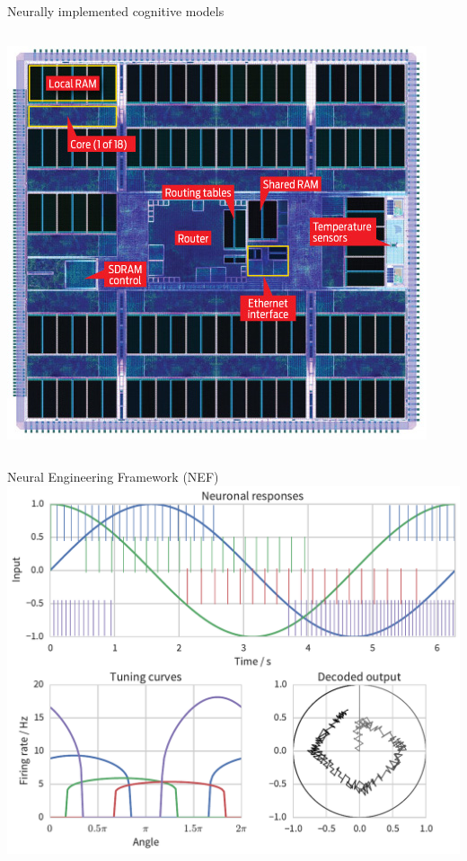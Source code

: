\documentclass[t]{beamer}
\begin{document}
\begin{frame}[plain]{Neurally implemented cognitive models}
\begin{columns}[c]
\begin{column}{.4\textwidth}
        \baselineskip

        \includegraphics[width=.75\textwidth]{figures/spinnaker}

      \end{column}
    \end{columns}

  \end{frame}

  \begin{frame}[plain]{Neural Engineering Framework (NEF)}
    \includegraphics[width=\textwidth]{figures/nef-1}
  \end{frame}
\end{document}
